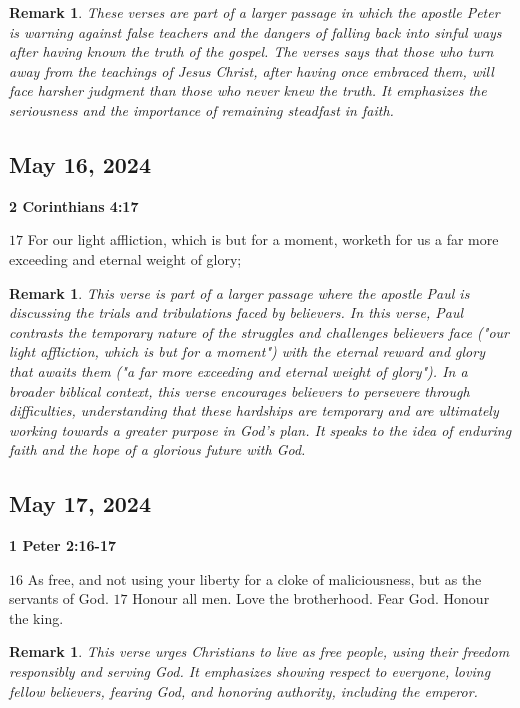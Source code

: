 \documentclass{article}
\newtheorem{remark}[theorem]{Remark}
\begin{document}
\begin{remark}
These verses are part of a larger passage in which the apostle Peter is
warning against false teachers and the dangers of falling back into sinful
ways after having known the truth of the gospel. The verses says that those
who turn away from the teachings of Jesus Christ, after having once embraced
them, will face harsher judgment than those who never knew the truth. It
emphasizes the seriousness and the importance of remaining steadfast in
faith.
\end{remark}

\bigskip

\subsection{May 16, 2024}

\textbf{2 Corinthians 4:17}

$17$ For our light affliction, which is but for a moment, worketh for us a
far more exceeding and eternal weight of glory;

\begin{remark}
This verse is part of a larger passage where the apostle Paul is discussing
the trials and tribulations faced by believers. In this verse, Paul
contrasts the temporary nature of the struggles and challenges believers
face ("our light affliction, which is but for a moment") with the eternal
reward and glory that awaits them ("a far more exceeding and eternal weight
of glory"). In a broader biblical context, this verse encourages believers
to persevere through difficulties, understanding that these hardships are
temporary and are ultimately working towards a greater purpose in God's
plan. It speaks to the idea of enduring faith and the hope of a glorious
future with God.
\end{remark}

\bigskip 

\subsection{May 17, 2024}

\textbf{1 Peter 2:16-17}

$16$ As free, and not using your liberty for a cloke of maliciousness, but
as the servants of God. $17$ Honour all men. Love the brotherhood. Fear God.
Honour the king. 

\begin{remark}
This verse urges Christians to live as free people, using their freedom
responsibly and serving God. It emphasizes showing respect to everyone,
loving fellow believers, fearing God, and honoring authority, including the
emperor.
\end{remark}
\end{document}
